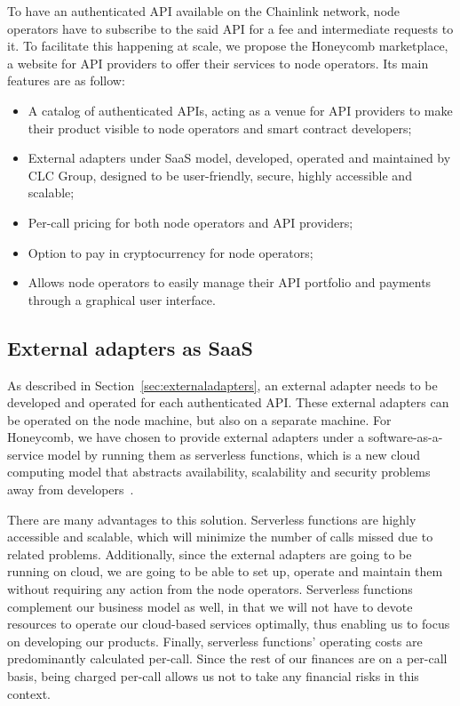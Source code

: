\documentclass[12pt]{article}
\begin{document}
To have an authenticated API available on the Chainlink network, node operators have to subscribe to the said API for a fee and intermediate requests to it.
To facilitate this happening at scale, we propose the Honeycomb marketplace, a website for API providers to offer their services to node operators. Its main features are as follow:
\begin{itemize}
	\item A catalog of authenticated APIs, acting as a venue for API providers to make their product visible to node operators and smart contract developers;
	\item External adapters under SaaS model, developed, operated and maintained by CLC Group, designed to be user-friendly, secure, highly accessible and scalable;
	\item Per-call pricing for both node operators and API providers;
	\item Option to pay in cryptocurrency for node operators;
	\item Allows node operators to easily manage their API portfolio and payments through a graphical user interface.
\end{itemize}

\subsection{External adapters as SaaS}
\label{sec:externaladaptersassaas}

As described in Section~\ref{sec:externaladapters}, an external adapter needs to be developed and operated for each authenticated API.
These external adapters can be operated on the node machine, but also on a separate machine.
For Honeycomb, we have chosen to provide external adapters under a software-as-a-service model by running them as serverless functions, which is a new cloud computing model that abstracts availability, scalability and security problems away from developers~\cite{Singleton:2016}.

There are many advantages to this solution.
Serverless functions are highly accessible and scalable, which will minimize the number of calls missed due to related problems.
Additionally, since the external adapters are going to be running on cloud, we are going to be able to set up, operate and maintain them without requiring any action from the node operators.
Serverless functions complement our business model as well, in that we will not have to devote resources to operate our cloud-based services optimally, thus enabling us to focus on developing our products.
Finally, serverless functions’ operating costs are predominantly calculated per-call.
Since the rest of our finances are on a per-call basis, being charged per-call allows us not to take any financial risks in this context.
\end{document}
